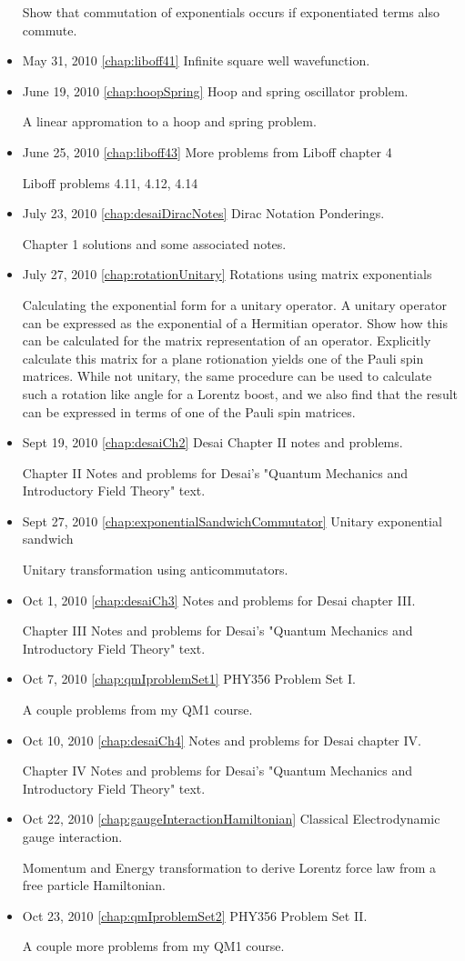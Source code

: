 \begin{itemize}
Show that commutation of exponentials occurs if exponentiated terms also commute.\item May 31, 2010 \ref{chap:liboff41} Infinite square well wavefunction.

\item June 19, 2010 \ref{chap:hoopSpring} Hoop and spring oscillator problem.

A linear appromation to a hoop and spring problem.\item June 25, 2010 \ref{chap:liboff43} More problems from Liboff chapter 4

Liboff problems 4.11, 4.12, 4.14\item July 23, 2010 \ref{chap:desaiDiracNotes} Dirac Notation Ponderings.

Chapter 1 solutions and some associated notes.\item July 27, 2010 \ref{chap:rotationUnitary} Rotations using matrix exponentials

Calculating the exponential form for a unitary operator.  A unitary operator can be expressed as the exponential of a Hermitian operator.  Show how this can be calculated for the matrix representation of an operator.  Explicitly calculate this matrix for a plane rotionation yields one of the Pauli spin matrices.  While not unitary, the same procedure can be used to calculate such a rotation like angle for a Lorentz boost, and we also find that the result can be expressed in terms of one of the Pauli spin matrices.\item Sept 19, 2010 \ref{chap:desaiCh2} Desai Chapter II notes and problems.

Chapter II Notes and problems for Desai's "Quantum Mechanics and Introductory Field Theory" text.\item Sept 27, 2010 \ref{chap:exponentialSandwichCommutator} Unitary exponential sandwich

Unitary transformation using anticommutators.\item Oct 1, 2010 \ref{chap:desaiCh3} Notes and problems for Desai chapter III.

Chapter III Notes and problems for Desai's "Quantum Mechanics and Introductory Field Theory" text.\item Oct 7, 2010 \ref{chap:qmIproblemSet1} PHY356 Problem Set I.

A couple problems from my QM1 course.\item Oct 10, 2010 \ref{chap:desaiCh4} Notes and problems for Desai chapter IV.

Chapter IV Notes and problems for Desai's "Quantum Mechanics and Introductory Field Theory" text.\item Oct 22, 2010 \ref{chap:gaugeInteractionHamiltonian} Classical Electrodynamic gauge interaction.

Momentum and Energy transformation to derive Lorentz force law from a free particle Hamiltonian.\item Oct 23, 2010 \ref{chap:qmIproblemSet2} PHY356 Problem Set II.

A couple more problems from my QM1 course.\end{itemize}

